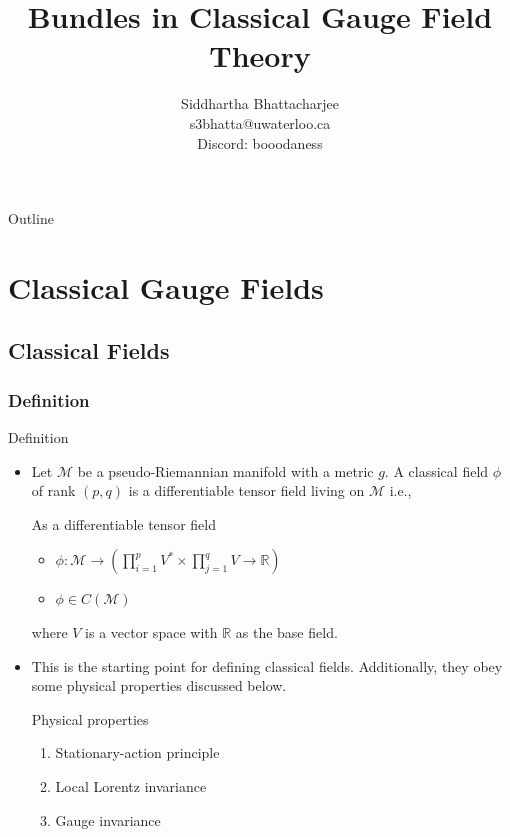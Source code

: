 \documentclass[9pt,handout]{beamer}
\title[\textbf{Bundles in Classical Gauge Field Theory}]{Bundles in Classical Gauge Field Theory}
\author[\textbf{Sid (s3bhatta@uwaterloo.ca)}]
{Siddhartha Bhattacharjee \\
s3bhatta@uwaterloo.ca \\
Discord: booodaness}
\institute[\textbf{University of Waterloo, Mathematical Physics}]
{Mathematical Physics (1C) \\
University of Waterloo
}
\begin{document}
{
\beamertemplatenavigationsymbolsempty
\begin{frame}[plain]
\titlepage
\end{frame}
}

{
\beamertemplatenavigationsymbolsempty
{}
{}

\begin{frame}{Outline} 
\tableofcontents 
\end{frame} 
}
\addtocounter{framenumber}{-2}

\section{Classical Gauge Fields}

\subsection{Classical Fields}

\subsubsection{Definition}
\begin{frame}{Definition}
\begin{itemize}
\item Let $\mathcal{M}$ be a pseudo-Riemannian manifold with a metric $g$. A classical field $\phi$ of rank $\left( p, q \right)$ is a differentiable tensor field living on $\mathcal{M}$ i.e.,

\begin{block}{As a differentiable tensor field}
\begin{itemize}
\item $\displaystyle{\phi : \mathcal{M} \to \left( \prod_{i=1}^{p} V^* \times \prod_{j=1}^q V \to \mathbb{R} \right)}$
\item $\phi \in C \left( \mathcal{M} \right)$
\end{itemize}
\end{block}

where $V$ is a vector space with $\mathbb{R}$ as the base field.

\item This is the starting point for defining classical fields. Additionally, they obey some physical properties discussed below.

\begin{block}{Physical properties}
\begin{enumerate}
\item Stationary-action principle
\item Local Lorentz invariance
\item Gauge invariance
\end{enumerate}
\end{block}

\end{itemize}
\end{frame}
\end{document}
